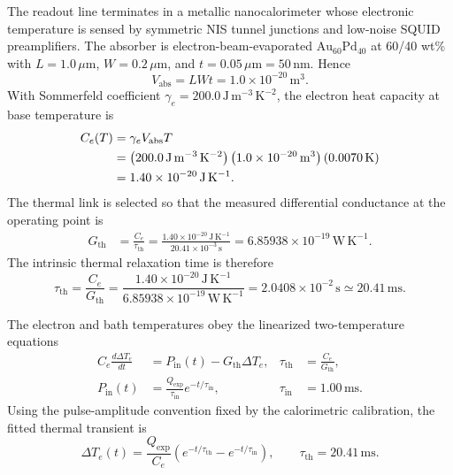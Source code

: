 \documentclass[11pt,letterpaper]{article}
\theoremstyle{plain}
\begin{document}
The readout line terminates in a metallic nanocalorimeter whose electronic
temperature is sensed by symmetric NIS tunnel junctions and low-noise SQUID
preamplifiers.  The absorber is electron-beam-evaporated
\(\mathrm{Au}_{60}\mathrm{Pd}_{40}\) at 60/40 wt\% with
\(L=1.0\,\mu\mathrm{m}\), \(W=0.2\,\mu\mathrm{m}\), and
\(t=0.05\,\mu\mathrm{m}=50\,\mathrm{nm}\).  Hence
\begin{equation}
\label{eq:calorimetry-absorber-volume}
 V_{\text{abs}}
 =
 LWt
 =
 1.0\times10^{-20}\,\mathrm{m^3}.
\end{equation}
With Sommerfeld coefficient
\(\gamma_{e}=200.0\,\mathrm{J\,m^{-3}\,K^{-2}}\), the electron heat
capacity at base temperature is
\begin{align}
\label{eq:calorimetry-electron-heat-capacity}
 C_e(T)
 &=
 \gamma_eV_{\text{abs}}T
 \notag\\
 &=
 \left(200.0\,\mathrm{J\,m^{-3}\,K^{-2}}\right)
 \left(1.0\times10^{-20}\,\mathrm{m^3}\right)
 \left(0.0070\,\mathrm{K}\right)
 \notag\\
 &=
 1.40\times10^{-20}\,\mathrm{J\,K^{-1}}.
\end{align}
The thermal link is selected so that the measured differential conductance at
the operating point is
\begin{align}
\label{eq:calorimetry-thermal-conductance}
 G_{\text{th}}
 &=
 \frac{C_e}{\tau_{\text{th}}}
 =
 \frac{1.40\times10^{-20}\,\mathrm{J\,K^{-1}}}
 {20.41\times10^{-3}\,\mathrm{s}}
 =
 6.85938\times10^{-19}\,\mathrm{W\,K^{-1}}.
\end{align}
The intrinsic thermal relaxation time is therefore
\begin{equation}
\label{eq:calorimetry-thermal-time-constant}
 \tau_{\text{th}}
 =
 \frac{C_e}{G_{\text{th}}}
 =
 \frac{1.40\times10^{-20}\,\mathrm{J\,K^{-1}}}
 {6.85938\times10^{-19}\,\mathrm{W\,K^{-1}}}
 =
 2.0408\times10^{-2}\,\mathrm{s}
 \simeq
 20.41\,\mathrm{ms}.
\end{equation}

The electron and bath temperatures obey the linearized two-temperature
equations
\begin{align}
\label{eq:calorimetry-two-temperature-system}
 C_e\frac{d\Delta T_e}{dt}
 &=
 P_{\text{in}}(t)-G_{\text{th}}\Delta T_e,
 &
 \tau_{\text{th}}&=\frac{C_e}{G_{\text{th}}},
\\
 P_{\text{in}}(t)
 &=
 \frac{Q_{\text{exp}}}{\tau_{\text{in}}}
 e^{-t/\tau_{\text{in}}},
 &
 \tau_{\text{in}}&=1.00\,\mathrm{ms}.
\end{align}
Using the pulse-amplitude convention fixed by the calorimetric calibration,
the fitted thermal transient is
\begin{equation}
\label{eq:calorimetry-two-temperature-pulse}
 \boxed{
 \Delta T_e(t)
 =
 \frac{Q_{\text{exp}}}{C_e}
 \left(
 e^{-t/\tau_{\text{th}}}
 -e^{-t/\tau_{\text{in}}}
 \right),
 \qquad
 \tau_{\text{th}}=20.41\,\mathrm{ms}.
 }
\end{equation}
\end{document}
